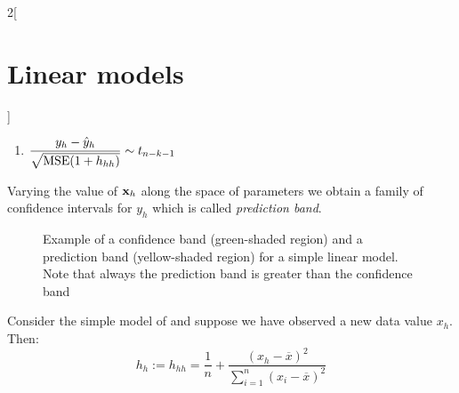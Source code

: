 \documentclass[../../../main_math.tex]{subfiles}
\begin{document}
\begin{multicols}{2}[\section{Linear models}]
\begin{proposition}
\begin{enumerate}
      \item $\displaystyle\frac{y_h-\hat{y}_h}{\sqrt{\operatorname{MSE} (1+h_{hh})}}\sim t_{n-k-1}$
    \end{enumerate}
    Varying the value of $\boldsymbol{\mathrm{x}}_h$ along the space of parameters we obtain a family of confidence intervals for $y_h$ which is called \emph{prediction band}.
  \end{proposition}
  \begin{figure}[H]
    \centering
    
    \caption{Example of a confidence band (green-shaded region) and a prediction band (yellow-shaded region) for a simple linear model. Note that always the prediction band is greater than the confidence band}
  \end{figure}
  \begin{corollary}
    Consider the simple model of  and suppose we have observed a new data value $x_h$. Then: $$h_{h}:=h_{hh}=\frac{1}{n}+\frac{{(x_h-\overline{x})}^2}{\sum_{i=1}^n{(x_i-\overline{x})}^2}$$
  \end{corollary}

\end{multicols}
\end{document}
